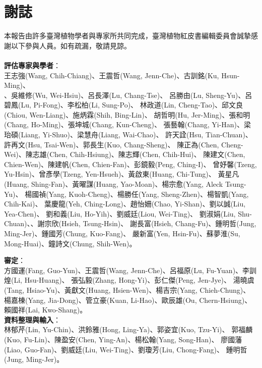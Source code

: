 \chapter{謝誌}

\linespread{1.1}\selectfont
本報告由許多臺灣植物學者與專家所共同完成，臺灣植物紅皮書編輯委員會誠摯感謝以下參與人員。如有疏漏，敬請見諒。 \\
\\
\noindent \textbf{評估專家與學者}：\\
\noindent 王志強(Wang, Chih-Chiang)、王震哲(Wang, Jenn-Che)、古訓銘(Ku, Hsun-Ming)、\\
、吳維修(Wu, Wei-Hsiu)、呂長澤(Lu, Chang-Tse)、
呂勝由(Lu, Sheng-Yu)、呂碧鳳(Lu, Pi-Fong)、李松柏(Li, Sung-Po)、
林政道(Lin, Cheng-Tao)、邱文良(Chiou, Wen-Liang)、施炳霖(Shih, Bing-Lin)、
胡哲明(Hu, Jer-Ming)、張和明(Chang, Ho-Ming)、張坤城(Chang, Kun-Cheng)、
張藝翰(Chang, Yi-Han)、梁珆碩(Liang, Yi-Shuo)、梁慧舟(Liang, Wai-Chao)、
許天詮(Hsu, Tian-Chuan)、許再文(Hsu, Tsai-Wen)、郭長生(Kuo, Chang-Sheng)、
陳正為(Chen, Cheng-Wei)、陳志雄(Chen, Chih-Hsiung)、陳志輝(Chen, Chih-Hui)、
陳建文(Chen, Chien-Wen)、陳建帆(Chen, Chien-Fan)、彭鏡毅(Peng, Ching-I)、
曾妤馨(Tzeng, Yu-Hsin)、曾彥學(Tzeng, Yen-Hsueh)、黃啟東(Huang, Chi-Tung)、
黃星凡(Huang, Shing-Fan)、黃曜謀(Huang, Yao-Moan)、楊宗愈(Yang, Aleck Tsung-Yu)、
楊國禎(Yang, Kuoh-Cheng)、楊勝任(Yang, Sheng-Zhen)、楊智凱(Yang, Chih-Kai)、
葉慶龍(Yeh, Ching-Long)、趙怡姍(Chao, Yi-Shan)、劉以誠(Liu, Yea-Chen)、
劉和義(Liu, Ho-Yih)、劉威廷(Liou, Wei-Ting)、
劉淑娟(Liu, Shu-Chuan)、、謝宗欣(Hsieh, Tsung-Hsin)、
謝長富(Hsieh, Chang-Fu)、鍾明哲(Jung, Ming-Jer)、鍾國芳(Chung, Kuo-Fang)、
嚴新富(Yen, Hsin-Fu)、蘇夢淮(Su, Mong-Huai)、鐘詩文(Chung, Shih-Wen)。

\noindent \textbf{審定}：\\
方國運(Fang, Guo-Yun)、王震哲(Wang, Jenn-Che)、呂福原(Lu, Fu-Yuan)、李訓煌(Li, Hsu-Huang)、
張弘毅(Zhang, Hong-Yi)、彭仁傑(Peng, Jen-Jye)、
湯曉虞(Tang, Hsiao-Yu)、黃獻文(Huang, Hsien-Wen)、楊吉宗(Yang, Chieh-Chung)、
楊嘉棟(Yang, Jia-Dong)、管立豪(Kuan, Li-Hao)、歐辰雄(Ou, Chern-Hsiung)、
賴國祥(Lai, Kwo-Shang)。 \\

\noindent \textbf{資料整理與輸入}：\\
林郁芹(Lin, Yu-Chin)、洪鈴雅(Hong, Ling-Ya)、郭姿宜(Kuo, Tzu-Yi)、
郭福麟(Kuo, Fu-Lin)、陳盈安(Chen, Ying-An)、楊松翰(Yang, Song-Han)、
廖國藩(Liao, Guo-Fan)、劉威廷(Liu, Wei-Ting)、劉瓊芳(Liu, Chong-Fang)、
鍾明哲(Jung, Ming-Jer)。

\linespread{1}\selectfont
